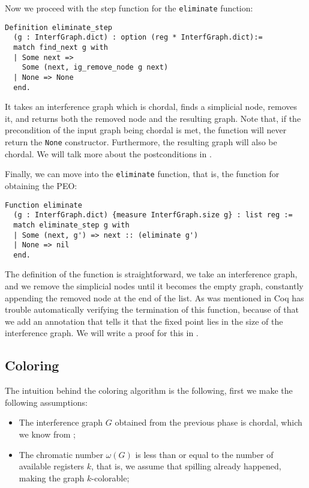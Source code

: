 Now we proceed with the step function for the \texttt{eliminate} function:

\begin{lstlisting}[style=Coq]
Definition eliminate_step
  (g : InterfGraph.dict) : option (reg * InterfGraph.dict):=
  match find_next g with
  | Some next =>
    Some (next, ig_remove_node g next)
  | None => None
  end.
\end{lstlisting}

It takes an interference graph which is chordal, finds a simplicial node, removes it, and returns both the removed node and the resulting graph.
Note that, if the precondition of the input graph being chordal is met, the function will never return the \texttt{None} constructor. Furthermore, the resulting graph will also be chordal.
We will talk more about the postconditions in .

Finally, we can move into the \texttt{eliminate} function, that is, the function for obtaining the PEO:

\begin{lstlisting}[style=Coq]
Function eliminate
  (g : InterfGraph.dict) {measure InterfGraph.size g} : list reg :=
  match eliminate_step g with
  | Some (next, g') => next :: (eliminate g')
  | None => nil
  end.
\end{lstlisting}

The definition of the function is straightforward, we take an interference graph, and we remove the simplicial nodes until it becomes the empty graph, constantly appending the removed node at the end of the list.
As was mentioned in  Coq has trouble automatically verifying the termination of this function, because of that we add an annotation that tells it that the fixed point lies in the size of the interference graph. We will write a proof for this in .

\subsection{Coloring}
\label{subsec:coloring}

The intuition behind the coloring algorithm is the following, first we make the following assumptions:

\begin{itemize}
  \item The interference graph $G$ obtained from the previous phase is chordal, which we know from ;
  \item The chromatic number $\omega(G)$ is less than or equal to the number of available registers $k$, that is, we assume that spilling already happened, making the graph $k$-colorable;
\end{itemize}

